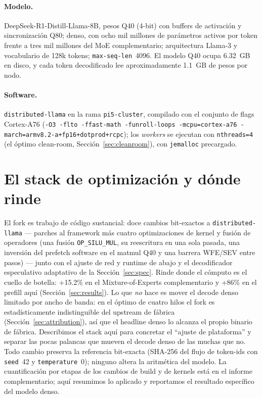 \documentclass[10pt,a4paper]{article}
\begin{document}
\paragraph{Modelo.} DeepSeek-R1-Distill-Llama-8B, pesos Q40 (4-bit) con buffers de activación y sincronización Q80; denso, con ocho mil millones de parámetros activos por token frente a tres mil millones del MoE complementario; arquitectura Llama-3 y vocabulario de 128k tokens; \texttt{max-seq-len}~4096. El modelo Q40 ocupa 6.32~GB en disco, y cada token decodificado lee aproximadamente 1.1~GB de pesos por nodo.

\paragraph{Software.} \texttt{distributed-llama} en la rama \texttt{pi5-cluster}, compilado con el conjunto de flags Cortex-A76 (\texttt{-O3 -flto -ffast-math -funroll-loops -mcpu=cortex-a76 -march=armv8.2-a+fp16+dotprod+rcpc}); los \emph{workers} se ejecutan con \texttt{nthreads=4} (el óptimo clean-room, Sección~\ref{sec:cleanroom}), con \texttt{jemalloc} precargado.

\section{El stack de optimización y dónde rinde}
\label{sec:stack}
El fork es trabajo de código sustancial: doce cambios bit-exactos a \texttt{distributed-llama} --- parches al framework más cuatro optimizaciones de kernel y fusión de operadores (una fusión \texttt{OP\_SILU\_MUL}, su reescritura en una sola pasada, una inversión del prefetch software en el matmul Q40 y una barrera WFE/SEV entre pasos) --- junto con el ajuste de red y runtime de abajo y el decodificador especulativo adaptativo de la Sección~\ref{sec:spec}. Rinde donde el cómputo es el cuello de botella: +15.2\% en el Mixture-of-Experts complementario y +86\% en el prefill aquí (Sección~\ref{sec:results}). Lo que \emph{no} hace es mover el decode denso limitado por ancho de banda: en el óptimo de cuatro hilos el fork es estadísticamente indistinguible del upstream de fábrica (Sección~\ref{sec:attribution}), así que el headline denso lo alcanza el propio binario de fábrica. Describimos el stack aquí para concretar el ``ajuste de plataforma'' y separar las pocas palancas que mueven el decode denso de las muchas que no. Todo cambio preserva la referencia bit-exacta (SHA-256 del flujo de token-ids con \texttt{seed}~42 y \texttt{temperature}~0); ninguno altera la aritmética del modelo. La cuantificación por etapas de los cambios de build y de kernels está en el informe complementario; aquí resumimos lo aplicado y reportamos el resultado específico del modelo denso.
\end{document}
